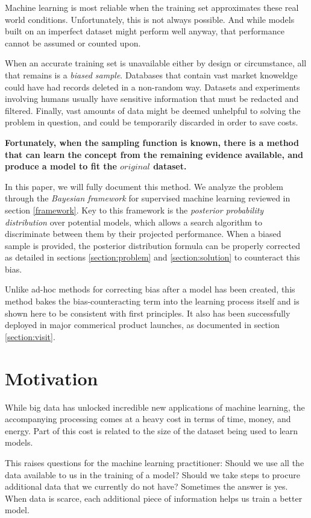 \documentclass[twoside]{article}
\begin{document}
Machine learning is most reliable when the training set approximates these real world conditions. Unfortunately, this is not always possible. And while models built on an imperfect dataset might perform well anyway, that performance cannot be assumed or counted upon.

When an accurate training set is unavailable either by design or circumstance, all that remains is a \textit{biased sample}. Databases that contain vast market knoweldge could have had records deleted in a non-random way. Datasets and experiments involving humans usually have sensitive information that must be redacted and filtered. Finally, vast amounts of data might be deemed unhelpful to solving the problem in question, and could be temporarily discarded in order to save costs.

\textbf{Fortunately, when the sampling function is known, there is a method that can learn the concept from the remaining evidence available, and produce a model to fit the \(original\) dataset.}

In this paper, we will fully document this method. We analyze the problem through the \textit{Bayesian framework} for supervised machine learning reviewed in section \ref{framework}. Key to this framework is the \textit{posterior probability distribution} over potential models, which allows a search algorithm to discriminate between them by their projected performance. When a biased sample is provided, the posterior distribution formula can be properly corrected as detailed in sections \ref{section:problem} and \ref{section:solution} to counteract this bias.

Unlike ad-hoc methods for correcting bias after a model has been created, this method bakes the bias-counteracting term into the learning process itself and is shown here to be consistent with first principles. It also has been successfully deployed in major commerical product launches, as documented in section \ref{section:visit}.

\section{Motivation}

While big data has unlocked incredible new applications of machine learning, the accompanying processing comes at a heavy cost in terms of time, money, and energy. Part of this cost is related to the size of the dataset being used to learn models.

This raises questions for the machine learning practitioner: Should we use all the data available to us in the training of a model? Should we take steps to procure additional data that we currently do not have? Sometimes the answer is yes. When data is scarce, each additional piece of information helps us train a better model.
\end{document}
